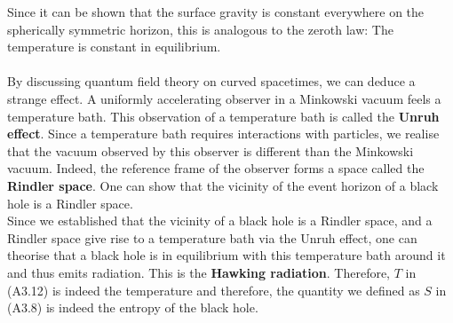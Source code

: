 \begin{appendices}
        Since it can be shown that the surface gravity is constant everywhere on the spherically symmetric horizon, this is analogous to the zeroth law: The temperature is constant in equilibrium. \\
        \\
        By discussing quantum field theory on curved spacetimes, we can deduce a strange effect. A uniformly accelerating observer in a Minkowski vacuum feels a temperature bath. This observation of a temperature bath is called the \textbf{Unruh effect}. Since a temperature bath requires interactions with particles, we realise that the vacuum observed by this observer is different than the Minkowski vacuum. Indeed, the reference frame of the observer forms a space called the \textbf{Rindler space}. One can show that the vicinity of the event horizon of a black hole is a Rindler space. \\
        Since we established that the vicinity of a black hole is a Rindler space, and a Rindler space give rise to a temperature bath via the Unruh effect, one can theorise that a black hole is in equilibrium with this temperature bath around it and thus emits radiation. This is the \textbf{Hawking radiation}. Therefore, $T$ in (A3.12) is indeed the temperature and therefore, the quantity we defined as $S$ in (A3.8) is indeed the entropy of the black hole.
        
\end{appendices}